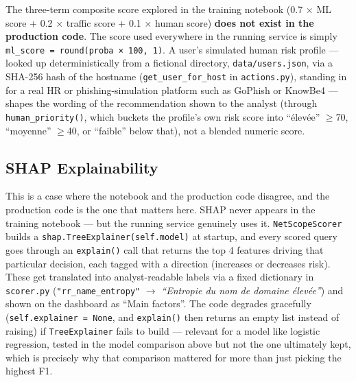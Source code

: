 The three-term composite score explored in the training notebook (0.7 ×
ML score + 0.2 × traffic score + 0.1 × human score) \textbf{does not exist
in the production code}. The score used everywhere in the running service
is simply \texttt{ml\_score = round(proba × 100, 1)}. A user's simulated
human risk profile --- looked up deterministically from a fictional
directory, \texttt{data/users.json}, via a SHA-256 hash of the hostname
(\texttt{get\_user\_for\_host} in \texttt{actions.py}), standing in for a
real HR or phishing-simulation platform such as GoPhish or KnowBe4 ---
shapes the wording of the recommendation shown to the analyst (through
\texttt{human\_priority()}, which buckets the profile's own risk score into
``élevée'' $\geq$70, ``moyenne'' $\geq$40, or ``faible'' below that), not a
blended numeric score.

\subsection*{SHAP Explainability}
This is a case where the notebook and the production code disagree, and the
production code is the one that matters here. SHAP never appears in the
training notebook --- but the running service genuinely uses it.
\texttt{NetScopeScorer} builds a \texttt{shap.TreeExplainer(self.model)} at
startup, and every scored query goes through an \texttt{explain()} call
that returns the top 4 features driving that particular decision, each
tagged with a direction (increases or decreases risk). These get translated
into analyst-readable labels via a fixed dictionary in \texttt{scorer.py}
(\texttt{"rr\_name\_entropy"} $\rightarrow$ \emph{``Entropie du nom de
domaine élevée''}) and shown on the dashboard as ``Main factors''. The code
degrades gracefully (\texttt{self.explainer = None}, and \texttt{explain()}
then returns an empty list instead of raising) if \texttt{TreeExplainer}
fails to build --- relevant for a model like logistic regression, tested in
the model comparison above but not the one ultimately kept, which is
precisely why that comparison mattered for more than just picking the
highest F1.

